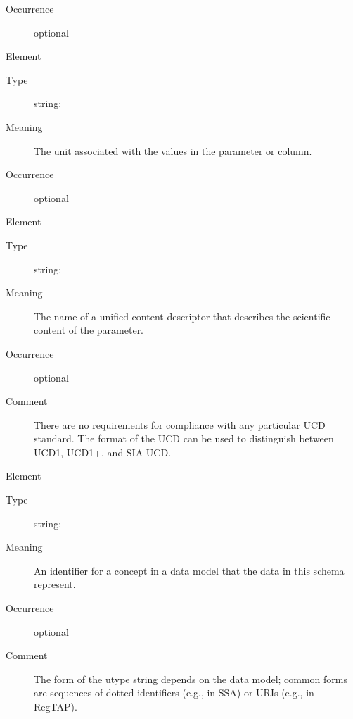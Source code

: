 \documentclass[11pt,a4paper]{ivoa}
\begin{document}
\begin{generated}
\begin{bigdescription}
\begin{description}
\item[Occurrence] optional

\end{description}
\item[Element \xmlel{unit}]
\begin{description}
\item[Type] string: 
\item[Meaning] 
                  The unit associated with the values in the parameter
                  or column.
               
\item[Occurrence] optional

\end{description}
\item[Element \xmlel{ucd}]
\begin{description}
\item[Type] string: 
\item[Meaning] 
                  The name of a unified content descriptor that
                  describes the scientific content of the parameter.
               
\item[Occurrence] optional
\item[Comment] 
                  There are no requirements for compliance with any 
                  particular UCD standard.  The format of the UCD can
                  be used to distinguish between UCD1, UCD1+, and
                  SIA-UCD.
               

\end{description}
\item[Element \xmlel{utype}]
\begin{description}
\item[Type] string: 
\item[Meaning] 
                  An identifier for a concept in a data model that
                  the data in this schema represent.  
               
\item[Occurrence] optional
\item[Comment] 
                  The form of the utype string depends on the data
                  model; common forms are sequences of dotted identifiers
                  (e.g., in SSA) or URIs (e.g., in RegTAP).
               

\end{description}


\end{bigdescription}\endgroup

\endgroup
\end{generated}
\end{document}
